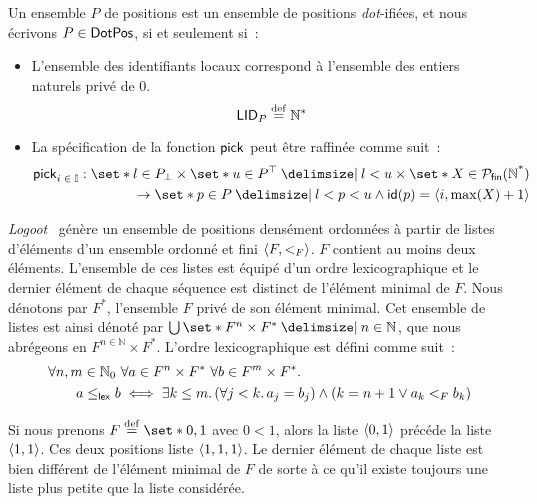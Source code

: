 \begin{definition}\label{def:dot-pos}
Un ensemble $P$ de positions est un ensemble de positions \emph{dot}-ifiées, et nous écrivons $P \in \trm{DotPos}$, si et seulement si~:
\begin{itemize}
\item L'ensemble des identifiants locaux correspond à l'ensemble des entiers naturels privé de $0$.
\begin{equation*}
    \trm{LID}_P \defeq \mathbb{N}^*
\end{equation*}

\item La spécification de la fonction $\trm{pick}$ peut être raffinée comme suit~:
\begin{equation*}\begin{split}
    \trm{pick}_{i\;\in\;\mathbb{I}}: \set*{l \in P_{\bot}} \times \set*{u \in P^{\top} \given l < u} \times \set*{X \in \powerfset{\trm{\mathbb{N}^*}}}\\
    \to \set*{p \in P \given l < p < u \land \trm{id}(p) = \tuple*{i, \max(X) + 1}}
\end{split}\end{equation*}
\end{itemize}
\end{definition}


\emph{Logoot}~\cite{weiss_2009_logoot} génère un ensemble de positions densément ordonnées à partir de listes d'éléments d'un ensemble ordonné et fini $\tuple*{F, <_F}$.
$F$ contient au moins deux éléments.
L'ensemble de ces listes est équipé d'un ordre lexicographique et le dernier élément de chaque séquence est distinct de l'élément minimal de $F$.
Nous dénotons par $F^*$, l'ensemble $F$ privé de son élément minimal.
Cet ensemble de listes est ainsi dénoté par $\bigcup \set*{F^n \times F^* \given n \in \mathbb{N}}$, que nous abrégeons en $F^{n \in \mathbb{N}} \times F^*$.
L'ordre lexicographique est défini comme suit~:
%
\begin{equation}\begin{split}
\MoveEqLeft \forall n, m \in \mathbb{N}_0\ \forall a \in F^n \times F^*\ \forall b \in F^m \times F^* \qsep\\
&a \leq_{\trm{lex}} b \iff \exists k \leq m \qsep (\forall j < k \qsep a_j = b_j) \land (k = n + 1 \lor a_k <_F b_k)
\end{split}\end{equation}

Si nous prenons $F \defeq \set*{0,1}$ avec $0 < 1$, alors la liste $\tuple{0, 1}$ précéde la liste $\tuple{1, 1}$. Ces deux positions liste $\tuple{1, 1, 1}$.
Le dernier élément de chaque liste est bien différent de l'élément minimal de $F$ de sorte à ce qu'il existe toujours une liste plus petite que la liste considérée.

